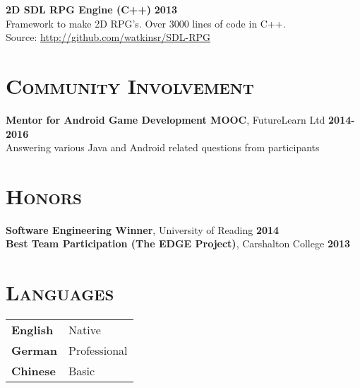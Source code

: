 \documentclass[line, margin, 10pt]{res}
\begin{document}
\begin{resume}
{\bf 2D SDL RPG Engine (C++)} {\bf \hfill 2013}\\
Framework to make 2D RPG's. Over 3000 lines of code in C++.  \\
Source: \url{http://github.com/watkinsr/SDL-RPG}

\newpage
\section{\textsc{Community Involvement}}

{\bf Mentor for Android Game Development MOOC}, FutureLearn Ltd {\bf \hfill 2014-2016}\\
Answering various Java and Android related questions from participants

\section{\textsc{Honors}}

{\bf Software Engineering Winner}, University of Reading {\bf \hfill 2014}\\
{\bf Best Team Participation (The EDGE Project)}, Carshalton College {\bf \hfill 2013}

\section{\textsc{Languages}}

\begin{tabular}[t]{@{} p{1.2in} p{3.75in} @{}}

\textbf{English} & Native\\ 
\textbf{German} & Professional\\ 
\textbf{Chinese} & Basic

\end{tabular}

\end{resume}
\end{document}
